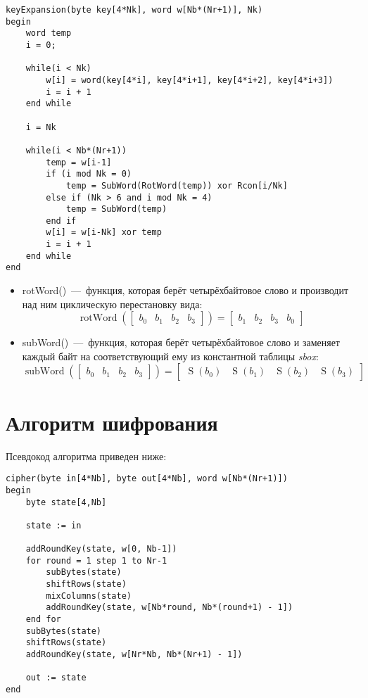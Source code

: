 \documentclass[utf8x, 14pt, bold, times]{G7-32} %
\begin{document}
\begin{lstlisting}[style=pseudocode]
keyExpansion(byte key[4*Nk], word w[Nb*(Nr+1)], Nk)
begin
    word temp
    i = 0;
    
    while(i < Nk)
        w[i] = word(key[4*i], key[4*i+1], key[4*i+2], key[4*i+3])
        i = i + 1
    end while
    
    i = Nk

    while(i < Nb*(Nr+1))
        temp = w[i-1]
        if (i mod Nk = 0)
            temp = SubWord(RotWord(temp)) xor Rcon[i/Nk]
        else if (Nk > 6 and i mod Nk = 4)
            temp = SubWord(temp)
        end if
        w[i] = w[i-Nk] xor temp
        i = i + 1
    end while
end
\end{lstlisting}

\begin{itemize}
\item rotWord()~---~функция, которая берёт четырёхбайтовое слово и производит
      над ним циклическую перестановку вида:
      $$
      \operatorname{rotWord}(
      \begin{bmatrix} 
        b_{0} & b_{1} & b_{2} & b_{3}
      \end{bmatrix}
      ) 
        =
      \begin{bmatrix}
        b_{1} & b_{2} & b_{3} & b_{0}
      \end{bmatrix}
      $$
\item subWord()~---~функция, которая берёт четырёхбайтовое слово и заменяет
      каждый байт на соответствующий ему из константной таблицы \textsl{sbox}:
      $$
      \operatorname{subWord}(
      \begin{bmatrix}
        b_{0} & b_{1} & b_{2} &b_{3}
      \end{bmatrix}
      )
        =
      \begin{bmatrix}
        \operatorname{S}(b_{0}) & \operatorname{S}(b_{1}) & \operatorname{S}(b_{2}) & \operatorname{S}(b_{3})
      \end{bmatrix}
      $$
\end{itemize}

\section{Алгоритм шифрования}

Псевдокод алгоритма приведен ниже:\\

\begin{lstlisting}[style=pseudocode]
cipher(byte in[4*Nb], byte out[4*Nb], word w[Nb*(Nr+1)])
begin
    byte state[4,Nb]
    
    state := in

    addRoundKey(state, w[0, Nb-1])
    for round = 1 step 1 to Nr-1
        subBytes(state)
        shiftRows(state)
        mixColumns(state)
        addRoundKey(state, w[Nb*round, Nb*(round+1) - 1])
    end for
    subBytes(state)
    shiftRows(state)
    addRoundKey(state, w[Nr*Nb, Nb*(Nr+1) - 1])

    out := state
end
\end{lstlisting}
\end{document}
